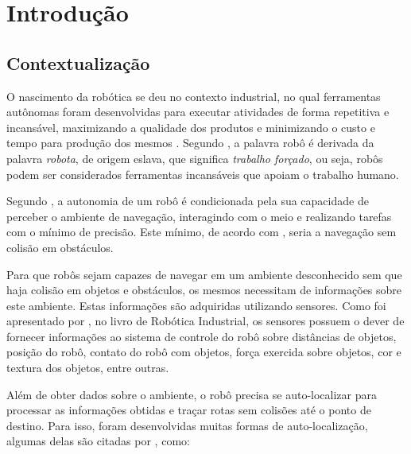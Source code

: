 \chapter[Introdução]{Introdução}

\section{Contextualização}
	
	O nascimento da robótica se deu no contexto industrial, no qual ferramentas autônomas foram desenvolvidas para executar atividades de forma repetitiva e incansável, maximizando a qualidade dos produtos e minimizando o custo e tempo para produção dos mesmos \cite{roboticaIndustrial}. Segundo \cite{roboticaIndustrial}, a palavra robô é derivada da palavra \textit{robota}, de origem eslava, que significa \textit{trabalho forçado}, ou seja, robôs podem ser considerados ferramentas incansáveis que apoiam o trabalho humano. 

	Segundo \cite{localizacaoEMapeamentoPaulo}, a autonomia de um robô é condicionada pela sua capacidade de perceber o ambiente de navegação, interagindo com o meio e realizando tarefas com o mínimo de precisão. Este mínimo, de acordo com \cite{localizacaoEMapeamentoPaulo}, seria a navegação sem colisão em obstáculos. 

	Para que robôs sejam capazes de navegar em um ambiente desconhecido sem que haja colisão em objetos e obstáculos, os mesmos necessitam de informações sobre este ambiente. Estas informações são adquiridas utilizando sensores. Como foi apresentado por \cite{interacaoRoboAmbiente}, no livro de Robótica Industrial, os sensores possuem o dever de fornecer informações ao sistema de controle do robô sobre distâncias de objetos, posição do robô, contato do robô com objetos, força exercida sobre objetos, cor e textura dos objetos, entre outras.

	Além de obter dados sobre o ambiente, o robô precisa se auto-localizar para processar as informações obtidas e traçar rotas sem colisões até o ponto de destino. Para isso, foram desenvolvidas muitas formas de auto-localização, algumas delas são citadas por \cite{roboBulldozerIV}, como:


